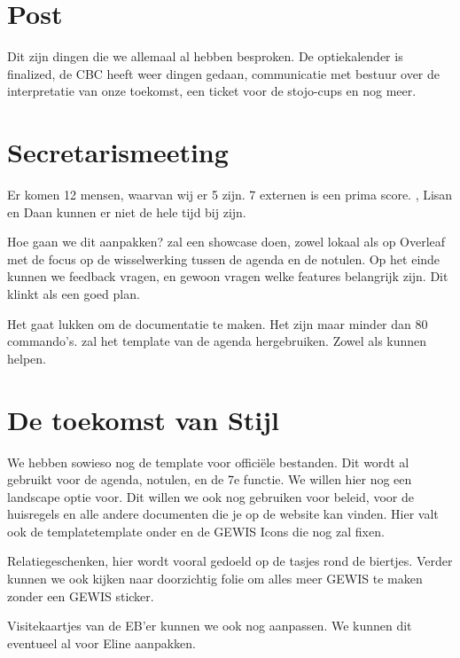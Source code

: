 \documentclass[
dutch
]{GEWISMinutes}
\begin{document}
	\section{Post}
	Dit zijn dingen die we allemaal al hebben besproken. De optiekalender is finalized, de CBC heeft weer dingen gedaan, communicatie met bestuur over de interpretatie van onze toekomst, een ticket voor de stojo-cups en nog meer.
	
	
	\section{Secretarismeeting}
	
	Er komen 12 mensen, waarvan wij er 5 zijn. 7 externen is een prima score. \nicky, Lisan en Daan kunnen er niet de hele tijd bij zijn. 
	
	Hoe gaan we dit aanpakken? \gijs zal een showcase doen, zowel lokaal als op Overleaf met de focus op de wisselwerking tussen de agenda en de notulen. Op het einde kunnen we feedback vragen, en gewoon vragen welke features belangrijk zijn. Dit klinkt als een goed plan.
	
	Het gaat \gijs lukken om de documentatie te maken. Het zijn maar minder dan 80 commando's. \gijs zal het template van de agenda hergebruiken. Zowel \rink als \sanne kunnen helpen.
	
	\section{De toekomst van Stijl}
	We hebben sowieso nog de template voor offici\"ele bestanden.
	Dit wordt al gebruikt voor de agenda, notulen, en de 7e functie. We willen hier nog een landscape optie voor. Dit willen we ook nog gebruiken voor beleid, voor de huisregels en alle andere documenten die je op de website kan vinden. Hier valt ook de templatetemplate onder en de GEWIS Icons die \rink nog zal fixen.
	
	Relatiegeschenken, hier wordt vooral gedoeld op de tasjes rond de biertjes. Verder kunnen we ook kijken naar doorzichtig folie om alles meer GEWIS te maken zonder een GEWIS sticker.
	
	Visitekaartjes van de EB'er kunnen we ook nog aanpassen. We kunnen dit eventueel al voor Eline aanpakken. 
	
\end{document}
